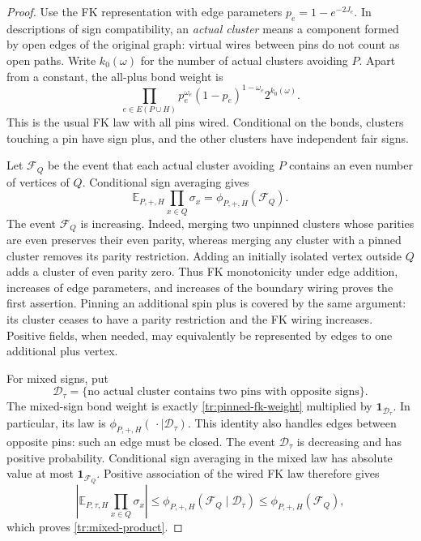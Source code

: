\begin{proof}
Use the FK representation with edge parameters $p_e=1-e^{-2J_e}$. In
descriptions of sign compatibility, an \emph{actual cluster} means a
component formed by open edges of the original graph: virtual wires between
pins do not count as open paths. Write $k_0(\omega)$ for the number of actual
clusters avoiding $P$. Apart from a constant, the all-plus bond weight is
\begin{equation}
\label{tr:pinned-fk-weight}
 \prod_{e\in E(P\cup H)}p_e^{\omega_e}(1-p_e)^{1-\omega_e}
 2^{k_0(\omega)}.
\end{equation}
This is the usual FK law with all pins wired. Conditional on the bonds,
clusters touching a pin have sign plus, and the other clusters have
independent fair signs.

Let $\mathcal F_Q$ be the event that each actual cluster avoiding $P$
contains an even number of vertices of $Q$. Conditional sign averaging gives
\begin{equation}
\label{tr:parity-event}
 \mathbb E_{P,+,H}\prod_{x\in Q}\sigma_x
 =\phi_{P,+,H}(\mathcal F_Q).
\end{equation}
The event $\mathcal F_Q$ is increasing. Indeed, merging two unpinned
clusters whose parities are even preserves their even parity, whereas
merging any cluster with a pinned cluster removes its parity restriction.
Adding an initially isolated vertex outside $Q$ adds a cluster of even
parity zero. Thus FK monotonicity under edge addition, increases of edge
parameters, and increases of the boundary wiring proves the first
assertion. Pinning an additional spin plus is covered by the same argument:
its cluster ceases to have a parity restriction and the FK wiring increases.
Positive fields, when needed, may equivalently be represented by edges to
one additional plus vertex.

For mixed signs, put
\[
 \mathcal D_\tau=
 \{\text{no actual cluster contains two pins with opposite signs}\}.
\]
The mixed-sign bond weight is exactly
\eqref{tr:pinned-fk-weight} multiplied by $\mathbf1_{\mathcal D_\tau}$.
In particular, its law is $\phi_{P,+,H}(\,\cdot\mid\mathcal D_\tau)$.
This identity also handles edges between opposite pins: such an edge must
be closed. The event $\mathcal D_\tau$ is decreasing and has positive
probability. Conditional sign averaging in the mixed law has absolute
value at most $\mathbf1_{\mathcal F_Q}$. Positive association of the wired
FK law therefore gives
\[
 \left|\mathbb E_{P,\tau,H}\prod_{x\in Q}\sigma_x\right|
 \leq \phi_{P,+,H}(\mathcal F_Q\mid\mathcal D_\tau)
 \leq \phi_{P,+,H}(\mathcal F_Q),
\]
which proves \eqref{tr:mixed-product}.


\end{proof}
